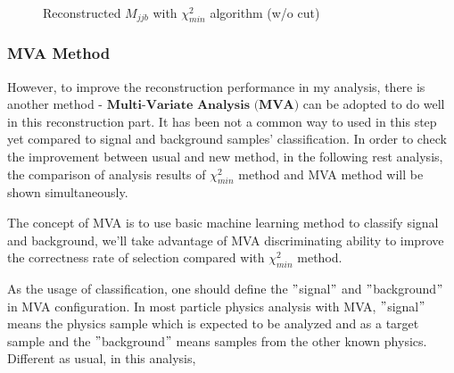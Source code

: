 \begin{figure}[H]
\centering
    \\
\caption{Reconstructed $M_{jjb}$ with $\chi^2_{min}$ algorithm (w/o cut)}
\label{EventSelReco:fig:chi2_SR_NC_Mjjb}
\end{figure}
\FloatBarrier

		\subsubsection{MVA Method}
		\label{sssec:mva_intro} 

			However, to improve the reconstruction performance in my analysis, there is another method - $\textbf{Multi-Variate Analysis (MVA)}$ can be adopted to do well in this reconstruction part. It has been not a common way to used in this step yet compared to signal and background samples' classification. In order to check the improvement between usual and new method, in the following rest analysis, the comparison of analysis results of $\chi^2_{min}$ method and MVA method will be shown simultaneously. 

			The concept of MVA is to use basic machine learning method to classify signal and background, we'll take advantage of MVA discriminating ability to improve the correctness rate of selection compared with $\chi^2_{min}$ method.
				
			As the usage of classification, one should define the $"$signal$"$ and $"$background$"$ in MVA configuration. In most particle physics analysis with MVA, $"$signal$"$ means the physics sample which is expected to be analyzed and as a target sample and the $"$background$"$ means samples from the other known physics. Different as usual, in this analysis,


